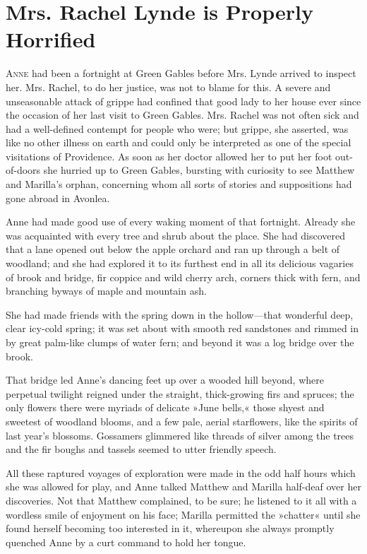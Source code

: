 \chapter{Mrs. Rachel Lynde is Properly Horrified}

\lettrine[lines=4]{A}{nne} had been a fortnight at Green Gables before Mrs. Lynde arrived to inspect her. Mrs. Rachel, to do her justice, was not to blame for this. A severe and unseasonable attack of grippe had confined that good lady to her house ever since the occasion of her last visit to Green Gables. Mrs. Rachel was not often sick and had a well-defined contempt for people who were; but grippe, she asserted, was like no other illness on earth and could only be interpreted as one of the special visitations of Providence. As soon as her doctor allowed her to put her foot out-of-doors she hurried up to Green Gables, bursting with curiosity to see Matthew and Marilla's orphan, concerning whom all sorts of stories and suppositions had gone abroad in Avonlea.

Anne had made good use of every waking moment of that fortnight. Already she was acquainted with every tree and shrub about the place. She had discovered that a lane opened out below the apple orchard and ran up through a belt of woodland; and she had explored it to its furthest end in all its delicious vagaries of brook and bridge, fir coppice and wild cherry arch, corners thick with fern, and branching byways of maple and mountain ash.

She had made friends with the spring down in the hollow—that wonderful deep, clear icy-cold spring; it was set about with smooth red sandstones and rimmed in by great palm-like clumps of water fern; and beyond it was a log bridge over the brook.

That bridge led Anne's dancing feet up over a wooded hill beyond, where perpetual twilight reigned under the straight, thick-growing firs and spruces; the only flowers there were myriads of delicate »June bells,« those shyest and sweetest of woodland blooms, and a few pale, aerial starflowers, like the spirits of last year's blossoms. Gossamers glimmered like threads of silver among the trees and the fir boughs and tassels seemed to utter friendly speech.

All these raptured voyages of exploration were made in the odd half hours which she was allowed for play, and Anne talked Matthew and Marilla half-deaf over her discoveries. Not that Matthew complained, to be sure; he listened to it all with a wordless smile of enjoyment on his face; Marilla permitted the »chatter« until she found herself becoming too interested in it, whereupon she always promptly quenched Anne by a curt command to hold her tongue.

